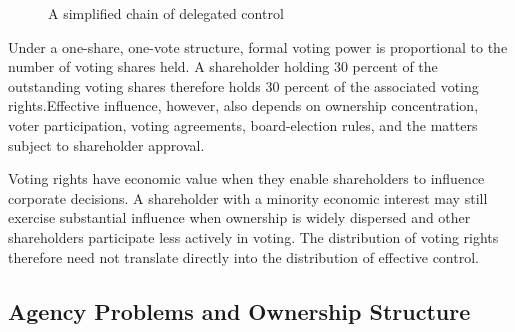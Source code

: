 \begin{figure}[htbp]
\centering


\caption{A simplified chain of delegated control}
\label{fig:ch9-governance-chain}
\end{figure}

Under a one-share, one-vote structure, formal voting
power is proportional to the number of voting shares
held. A shareholder holding 30 percent of the
outstanding voting shares therefore holds 30 percent
of the associated voting rights.Effective influence, however, also depends on ownership concentration, voter participation, voting agreements, board-election rules, and the matters subject to shareholder approval.

Voting rights have economic value when they enable
shareholders to influence corporate decisions.
A shareholder with a minority economic interest
may still exercise substantial influence when
ownership is widely dispersed and other shareholders
participate less actively in voting. The distribution
of voting rights therefore need not translate directly
into the distribution of effective control.

\subsection{Agency Problems and Ownership Structure}

